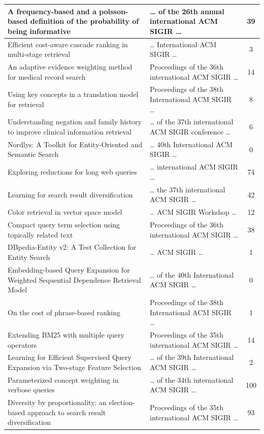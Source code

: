 \documentclass[letterpaper,12pt]{article}
\begin{document}
\begin{longtable}{|p{9cm}|p{5cm}|c|}
A frequency-based and a poisson-based definition of the probability of being informative & … of the 26th annual international ACM SIGIR … & 39  \\ \hline
Efficient cost-aware cascade ranking in multi-stage retrieval & … International ACM SIGIR … & 3  \\ \hline
An adaptive evidence weighting method for medical record search & Proceedings of the 36th international ACM SIGIR … & 14  \\ \hline
Using key concepts in a translation model for retrieval & Proceedings of the 38th International ACM SIGIR … & 8  \\ \hline
Understanding negation and family history to improve clinical information retrieval & … of the 37th international ACM SIGIR conference … & 6  \\ \hline
Nordlys: A Toolkit for Entity-Oriented and Semantic Search & … 40th International ACM SIGIR … & 0  \\ \hline
Exploring reductions for long web queries & … international ACM SIGIR … & 74  \\ \hline
Learning for search result diversification & … the 37th international ACM SIGIR … & 42  \\ \hline
Color retrieval in vector space model & … ACM SIGIR Workshop … & 12  \\ \hline
Compact query term selection using topically related text & Proceedings of the 36th international ACM SIGIR … & 38  \\ \hline
DBpedia-Entity v2: A Test Collection for Entity Search & … ACM SIGIR … & 1  \\ \hline
Embedding-based Query Expansion for Weighted Sequential Dependence Retrieval Model & … of the 40th International ACM SIGIR … & 0  \\ \hline
On the cost of phrase-based ranking & Proceedings of the 38th International ACM SIGIR … & 1  \\ \hline
Extending BM25 with multiple query operators & Proceedings of the 35th international ACM SIGIR … & 14  \\ \hline
Learning for Efficient Supervised Query Expansion via Two-stage Feature Selection & … of the 39th International ACM SIGIR … & 2  \\ \hline
Parameterized concept weighting in verbose queries & … of the 34th international ACM SIGIR … & 100  \\ \hline
Diversity by proportionality: an election-based approach to search result diversification & Proceedings of the 35th international ACM SIGIR … & 93  \\ \hline

\end{longtable}
\end{document}
